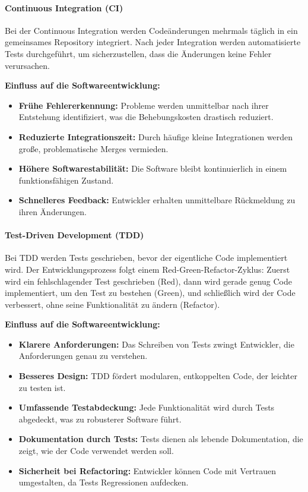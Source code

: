 \paragraph{Continuous Integration (CI)}
Bei der Continuous Integration werden Codeänderungen mehrmals täglich in ein gemeinsames Repository integriert. Nach jeder Integration 
werden automatisierte Tests durchgeführt, um sicherzustellen, dass die Änderungen keine Fehler verursachen.

\textbf{Einfluss auf die Softwareentwicklung:}
\begin{itemize}
    \item \textbf{Frühe Fehlererkennung:} Probleme werden unmittelbar nach ihrer Entstehung identifiziert, was die Behebungskosten drastisch reduziert.
    \item \textbf{Reduzierte Integrationszeit:} Durch häufige kleine Integrationen werden große, problematische Merges vermieden.
    \item \textbf{Höhere Softwarestabilität:} Die Software bleibt kontinuierlich in einem funktionsfähigen Zustand.
    \item \textbf{Schnelleres Feedback:} Entwickler erhalten unmittelbare Rückmeldung zu ihren Änderungen.
\end{itemize}

\paragraph{Test-Driven Development (TDD)}
Bei TDD werden Tests geschrieben, bevor der eigentliche Code implementiert wird. Der Entwicklungsprozess folgt 
einem Red-Green-Refactor-Zyklus: Zuerst wird ein fehlschlagender Test geschrieben (Red), dann wird gerade genug Code implementiert,
um den Test zu bestehen (Green), und schließlich wird der Code verbessert, ohne seine Funktionalität zu ändern (Refactor).

\textbf{Einfluss auf die Softwareentwicklung:}
\begin{itemize}
    \item \textbf{Klarere Anforderungen:} Das Schreiben von Tests zwingt Entwickler, die Anforderungen genau zu verstehen.
    \item \textbf{Besseres Design:} TDD fördert modularen, entkoppelten Code, der leichter zu testen ist.
    \item \textbf{Umfassende Testabdeckung:} Jede Funktionalität wird durch Tests abgedeckt, was zu robusterer Software führt.
    \item \textbf{Dokumentation durch Tests:} Tests dienen als lebende Dokumentation, die zeigt, wie der Code verwendet werden soll.
    \item \textbf{Sicherheit bei Refactoring:} Entwickler können Code mit Vertrauen umgestalten, da Tests Regressionen aufdecken.
\end{itemize}

